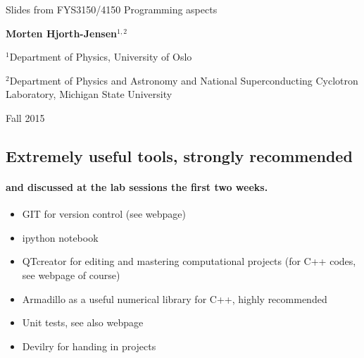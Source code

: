 \documentclass[%
twoside,                 %
final,                   %
10pt]{article}
\newenvironment{paragraphadmon}[1][]{\paragraph{#1}}{}
\begin{document}






\thispagestyle{empty}

\begin{center}
{\LARGE\bf
\begin{spacing}{1.25}
Slides from FYS3150/4150 Programming aspects
\end{spacing}
}
\end{center}


\begin{center}
{\bf Morten Hjorth-Jensen${}^{1, 2}$} \\ [0mm]
\end{center}

    \begin{center}
\centerline{{\small ${}^1$Department of Physics, University of Oslo}}
\centerline{{\small ${}^2$Department of Physics and Astronomy and National Superconducting Cyclotron Laboratory, Michigan State University}}
\end{center}


\begin{center}
Fall 2015
\end{center}

\vspace{1cm}


\subsection{Extremely useful tools, strongly recommended}


\begin{paragraphadmon}[and discussed at the lab sessions the first two weeks.]
\begin{itemize}
  \item GIT for version control (see webpage)

  \item ipython notebook

  \item QTcreator for editing and mastering computational projects (for C++ codes, see webpage of course)

  \item Armadillo as a useful numerical library for C++, highly recommended

  \item Unit tests, see also webpage

  \item Devilry for handing in projects
\end{itemize}

\noindent
\end{paragraphadmon}
\end{document}
